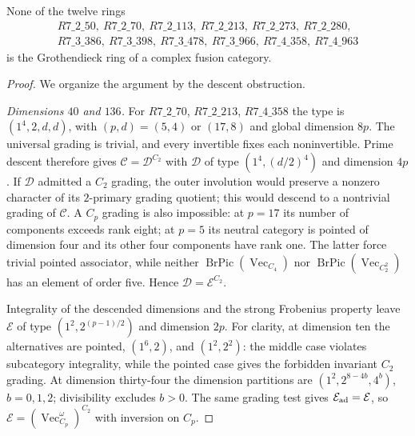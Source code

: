 \begin{proposition}\label{prop:primefamilies}
None of the twelve rings
\[
\begin{gathered}
R7\_2\_50,\ R7\_2\_70,\ R7\_2\_113,\ R7\_2\_213,
\ R7\_2\_273,\ R7\_2\_280,\\
R7\_3\_386,\ R7\_3\_398,\ R7\_3\_478,\ R7\_3\_966,
\ R7\_4\_358,\ R7\_4\_963
\end{gathered}
\]
is the Grothendieck ring of a complex fusion category.
\end{proposition}
\begin{proof}
We organize the argument by the descent obstruction.

\emph{Dimensions $40$ and $136$.}
For $R7\_2\_70$, $R7\_2\_213$, $R7\_4\_358$ the type is
$(1^4,2,d,d)$, with $(p,d)=(5,4)$ or $(17,8)$ and global dimension
$8p$. The universal grading is trivial, and every invertible fixes each
noninvertible. Prime descent therefore gives
$\mathcal C=\mathcal D^{C_2}$ with $\mathcal D$ of type
$(1^4,(d/2)^4)$ and dimension $4p$.
If $\mathcal D$ admitted a $C_2$ grading, the outer involution would
preserve a nonzero character of its $2$-primary grading quotient;
this would descend to a nontrivial grading of $\mathcal C$. A $C_p$
grading is also impossible: at $p=17$ its number of components exceeds
rank eight; at $p=5$ its neutral category is pointed of dimension four
and its other four components have rank one. The latter force trivial
pointed associator, while neither
$\operatorname{BrPic}(\operatorname{Vec}_{C_4})$ nor
$\operatorname{BrPic}(\operatorname{Vec}_{C_2^2})$ has an element of
order five. Hence $\mathcal D=\mathcal E^{C_2}$.

Integrality of the descended dimensions and the strong Frobenius
property \cite{ENOSolvable} leave
$\mathcal E$ of type $(1^2,2^{(p-1)/2})$ and dimension $2p$.
For clarity, at dimension ten the alternatives are pointed,
$(1^6,2)$, and $(1^2,2^2)$: the middle case violates subcategory
integrality, while the pointed case gives the forbidden invariant
$C_2$ grading. At dimension thirty-four the dimension partitions are
$(1^2,2^{8-4b},4^b)$, $b=0,1,2$; divisibility excludes $b>0$.
The same grading test gives $\mathcal E_{\rm ad}=\mathcal E$, so
$\mathcal E=(\operatorname{Vec}_{C_p}^{\omega})^{C_2}$ with inversion
on $C_p$.


\end{proof}
